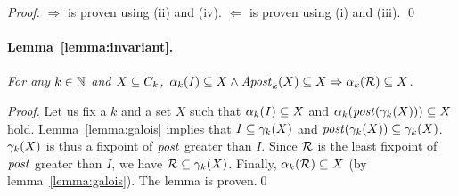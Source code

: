 \begin{proof}
$\Rightarrow$ is proven using (ii) and (iv).
$\Leftarrow$ is proven using (i) and (iii).
\qed
\end{proof}

\paragraph{\bf Lemma~\ref{lemma:invariant}.}
{\it
For any $k\in\nat$ and $X\subseteq\viewsof k$, $\projof \inits k\subseteq X \wedge \apostof X k\subseteq X \Rightarrow \projof {\reach} k\subseteq X$.  
}

\begin{proof}
  Let us fix a $k$ and a set $X$ such that $\projof{\inits}
  k\subseteq X$ and $\projof {\postof{\gammaof k (X)}} k\subseteq X$
  hold.
%
  Lemma~\ref{lemma:galois} implies that
  $\inits\subseteq{\gammaof k (X)}$ and
  $\postof{\gammaof k (X)}\subseteq{\gammaof k (X)}$.
%
% 
$\gammaof k (X)$ is thus a fixpoint of $\post$ greater than $I$.
Since $\reach$ is the least fixpoint of $\post$ greater than $I$, 
we have $\reach\subseteq{\gammaof k (X)}$.
Finally,
  $\projof{\reach}{k}\subseteq X$ (by lemma~\ref{lemma:galois}). 
  The lemma is proven.\qed
\end{proof}

